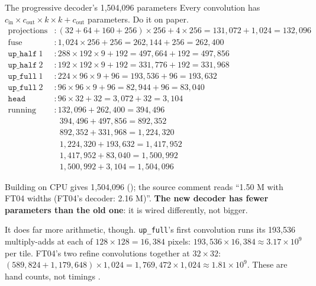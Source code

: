 \begin{worked}[label={we:decoderwork:prog}]{The progressive decoder's 1,504,096 parameters}
Every convolution has $c_\text{in}\times c_\text{out}\times k\times k+c_\text{out}$ parameters. Do it on paper.
\begin{align*}
\text{projections} &: (32+64+160+256)\times256 + 4\times256 = 131{,}072+1{,}024 = 132{,}096\\
\text{fuse} &: 1{,}024\times256+256 = 262{,}144+256 = 262{,}400\\
\texttt{up\_half}\ 1 &: 288\times192\times9+192 = 497{,}664+192 = 497{,}856\\
\texttt{up\_half}\ 2 &: 192\times192\times9+192 = 331{,}776+192 = 331{,}968\\
\texttt{up\_full}\ 1 &: 224\times96\times9+96 = 193{,}536+96 = 193{,}632\\
\texttt{up\_full}\ 2 &: 96\times96\times9+96 = 82{,}944+96 = 83{,}040\\
\texttt{head} &: 96\times32+32 = 3{,}072+32 = 3{,}104\\[3pt]
\text{running total} &: 132{,}096+262{,}400 = 394{,}496\\
&\phantom{:}\ 394{,}496+497{,}856 = 892{,}352\\
&\phantom{:}\ 892{,}352+331{,}968 = 1{,}224{,}320\\
&\phantom{:}\ 1{,}224{,}320+193{,}632 = 1{,}417{,}952\\
&\phantom{:}\ 1{,}417{,}952+83{,}040 = 1{,}500{,}992\\
&\phantom{:}\ 1{,}500{,}992+3{,}104 = 1{,}504{,}096
\end{align*}
\end{worked}

\begin{sourcenote}[: 1,504,096 verified]
Building  on CPU gives 1,504,096 \tagC
(); the source comment reads ``1.50 M with FT04 widths (FT04's
decoder: 2.16 M)''. \textbf{The new decoder has fewer parameters than the old one}: it is wired differently, not
bigger.
\end{sourcenote}

It does far more arithmetic, though. \texttt{up\_full}'s first convolution runs its 193,536 multiply-adds at each
of $128\times128=16{,}384$ pixels: $193{,}536\times16{,}384\approx3.17\times10^9$ per tile. FT04's two refine
convolutions together at $32\times32$: $(589{,}824+1{,}179{,}648)\times1{,}024=1{,}769{,}472\times1{,}024\approx
1.81\times10^9$. These are hand counts, not timings \tagC.

